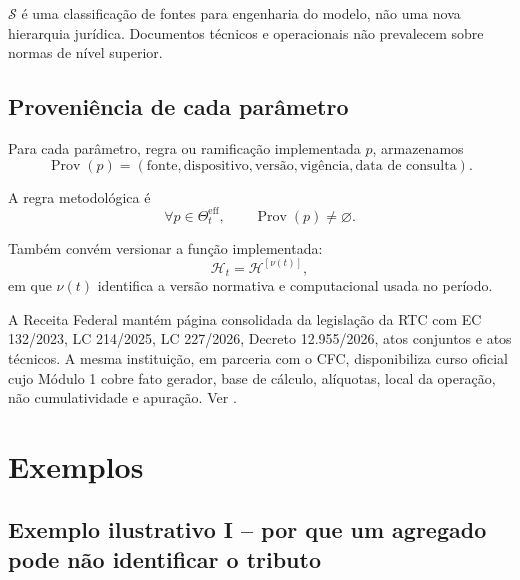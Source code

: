 \documentclass[11pt,a4paper]{article}
\newcommand{\cH}{\mathcal{H}}
\newcommand{\cS}{\mathcal{S}}
\newcommand{\Prov}{\operatorname{Prov}}
\begin{document}
\begin{cuidado}
$\cS$ é uma classificação de fontes para engenharia do modelo, não uma nova hierarquia jurídica. Documentos técnicos e operacionais não prevalecem sobre normas de nível superior.
\end{cuidado}

\subsection{Proveniência de cada parâmetro}

Para cada parâmetro, regra ou ramificação implementada $p$, armazenamos
\begin{equation}
\boxed{
\Prov(p)=
(\text{fonte},\text{dispositivo},\text{versão},\text{vigência},\text{data de consulta}).
}
\label{eq:provenance}
\end{equation}

A regra metodológica é
\begin{equation}
\boxed{
\forall p\in\Theta_t^{\mathrm{eff}},\qquad \Prov(p)\neq\varnothing.
}
\label{eq:trace-rule}
\end{equation}

Também convém versionar a função implementada:
\begin{equation}
\cH_t=\cH^{[\nu(t)]},
\end{equation}
em que $\nu(t)$ identifica a versão normativa e computacional usada no período.

\begin{fonte}
A Receita Federal mantém página consolidada da legislação da RTC com EC 132/2023, LC 214/2025, LC 227/2026, Decreto 12.955/2026, atos conjuntos e atos técnicos. A mesma instituição, em parceria com o CFC, disponibiliza curso oficial cujo Módulo 1 cobre fato gerador, base de cálculo, alíquotas, local da operação, não cumulatividade e apuração. Ver \cite{RFB_RTC_LEG,RFB_CURSO}.
\end{fonte}

\section{Exemplos}

\subsection{Exemplo ilustrativo I -- por que um agregado pode não identificar o tributo}
\end{document}
